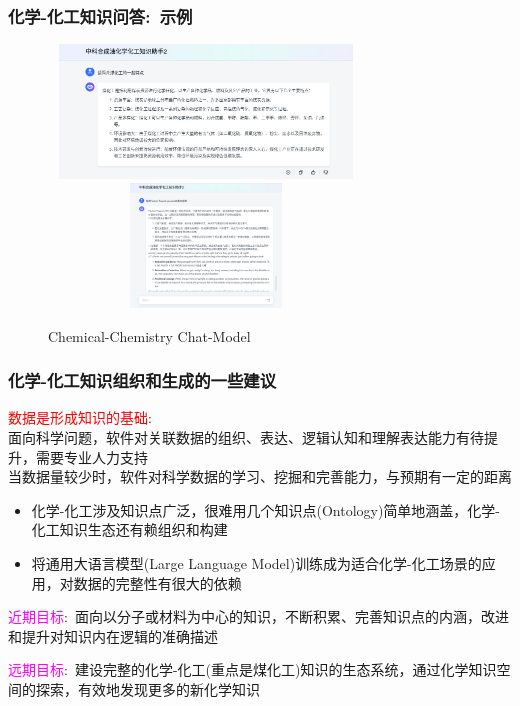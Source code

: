 \begin{frame}
	\frametitle{化学-化工知识问答:~示例}	
\begin{figure}[h!]
\centering
\vskip -8pt
\includegraphics[height=1.40in,width=3.30in,viewport=0 0 978 447,clip]{Figures/Allma_MaxKB-1.png}
\includegraphics[height=1.30in,width=3.30in,viewport=0 342 924 759,clip]{Figures/Allma_MaxKB-2.png}
\caption{\tiny\textrm{Chemical-Chemistry Chat-Model}}%
\label{Fig:MaxKB_Chat-Model-2}
\end{figure}
\end{frame}
%
\frame
{
	\frametitle{化学-化工知识组织和生成的一些建议}
	\textcolor{red}{数据是形成知识的基础}:~\\
	面向科学问题，软件对关联数据的组织、表达、逻辑认知和理解表达能力有待提升，需要专业人力支持\\
	当数据量较少时，软件对科学数据的学习、挖掘和完善能力，与预期有一定的距离
	\begin{itemize}
		\item 化学-化工涉及知识点广泛，很难用几个知识点\textrm{(Ontology)}简单地涵盖，化学-化工知识生态还有赖组织和构建
		\item 将通用大语言模型\textrm{(Large Language Model)}训练成为适合化学-化工场景的应用，对数据的完整性有很大的依赖
	\end{itemize}
	\textcolor{magenta}{近期目标}:~面向以分子或材料为中心的知识，不断积累、完善知识点的内涵，改进和提升对知识内在逻辑的准确描述

\textcolor{magenta}{远期目标}:~建设完整的化学-化工(重点是煤化工)知识的生态系统，通过化学知识空间的探索，有效地发现更多的新化学知识
}

